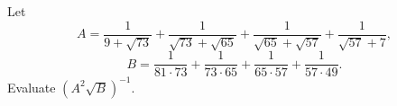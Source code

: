 Let
\[
A=\dfrac{1}{9+\sqrt{73}}+\dfrac{1}{\sqrt{73}+\sqrt{65}}
+\dfrac{1}{\sqrt{65}+\sqrt{57}}+\dfrac{1}{\sqrt{57}+7},
\]
\[
B=\dfrac{1}{81\cdot73}+\dfrac{1}{73\cdot65}
+\dfrac{1}{65\cdot57}+\dfrac{1}{57\cdot49}.
\]
Evaluate $(A^2\sqrt B)^{-1}$.

